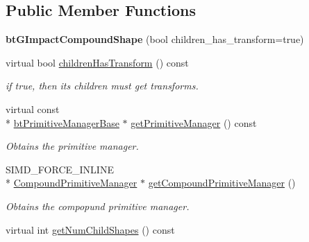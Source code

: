 \subsection*{Public Member Functions}
\begin{DoxyCompactItemize}
\item 
\hypertarget{classbt_g_impact_compound_shape_a315f703c2006537efde116aceef17b57}{{\bfseries bt\+G\+Impact\+Compound\+Shape} (bool children\+\_\+has\+\_\+transform=true)}\label{classbt_g_impact_compound_shape_a315f703c2006537efde116aceef17b57}

\item 
\hypertarget{classbt_g_impact_compound_shape_aba1553b4463a14eb56a6d5cdccca4ead}{virtual bool \hyperlink{classbt_g_impact_compound_shape_aba1553b4463a14eb56a6d5cdccca4ead}{children\+Has\+Transform} () const }\label{classbt_g_impact_compound_shape_aba1553b4463a14eb56a6d5cdccca4ead}

\begin{DoxyCompactList}\small\item\em if true, then its children must get transforms. \end{DoxyCompactList}\item 
\hypertarget{classbt_g_impact_compound_shape_a56d7a7369cd905893fa61a766c6ae2f5}{virtual const \\*
\hyperlink{classbt_primitive_manager_base}{bt\+Primitive\+Manager\+Base} $\ast$ \hyperlink{classbt_g_impact_compound_shape_a56d7a7369cd905893fa61a766c6ae2f5}{get\+Primitive\+Manager} () const }\label{classbt_g_impact_compound_shape_a56d7a7369cd905893fa61a766c6ae2f5}

\begin{DoxyCompactList}\small\item\em Obtains the primitive manager. \end{DoxyCompactList}\item 
\hypertarget{classbt_g_impact_compound_shape_a5608f37c18454c3e82504120e053f67a}{S\+I\+M\+D\+\_\+\+F\+O\+R\+C\+E\+\_\+\+I\+N\+L\+I\+N\+E \\*
\hyperlink{classbt_g_impact_compound_shape_1_1_compound_primitive_manager}{Compound\+Primitive\+Manager} $\ast$ \hyperlink{classbt_g_impact_compound_shape_a5608f37c18454c3e82504120e053f67a}{get\+Compound\+Primitive\+Manager} ()}\label{classbt_g_impact_compound_shape_a5608f37c18454c3e82504120e053f67a}

\begin{DoxyCompactList}\small\item\em Obtains the compopund primitive manager. \end{DoxyCompactList}\item 
\hypertarget{classbt_g_impact_compound_shape_a1e48017b7d2f2cf2498606e2084c01e1}{virtual int \hyperlink{classbt_g_impact_compound_shape_a1e48017b7d2f2cf2498606e2084c01e1}{get\+Num\+Child\+Shapes} () const }\label{classbt_g_impact_compound_shape_a1e48017b7d2f2cf2498606e2084c01e1}


\end{DoxyCompactItemize}
